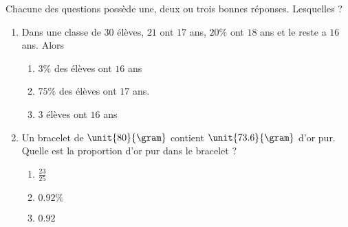 
\begin{exercice}\label{exoPremiere-0014}

    Chacune des questions possède une, deux ou trois bonnes réponses. Lesquelles ?
    \begin{enumerate}
        \item
        Dans une classe de \( 30\) élèves, \( 21\) ont \( 17\) ans, \( 20\%\) ont \( 18\) ans et le reste a \( 16\) ans.  Alors
        \begin{enumerate}
            \item

         \( 3\%\) des élèves ont \( 16\) ans
     \item
         \( 75\%\) des élèves ont \( 17\) ans.
     \item
         \( 3\) élèves ont \( 16\) ans
                
        \end{enumerate}
    \item
        Un bracelet de \( \unit{80}{\gram}\) contient \( \unit{73.6}{\gram}\) d'or pur. Quelle est la proportion d'or pur dans le bracelet ?
        \begin{enumerate}
            \item
        \( \frac{ 23 }{ 25 }\)
    \item
        \( 0.92\%\)
    \item
        \( 0.92\)

        \end{enumerate}


\end{enumerate}
\end{exercice}
